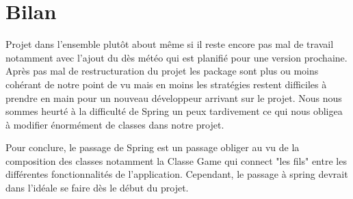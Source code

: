 \chapter{Bilan}

Projet dans l'ensemble plutôt about même si il  reste encore pas mal de travail notamment avec l'ajout du dès météo qui est planifié pour une version prochaine. Après pas mal de restructuration du projet les package sont plus ou moins cohérant de notre point de vu mais en moins les stratégies restent difficiles à prendre en main pour un nouveau développeur arrivant sur le projet. Nous nous sommes heurté à la difficulté de Spring un peux tardivement ce qui nous obligea à modifier énormément de classes dans notre projet.


Pour conclure, le passage de Spring est un passage obliger au vu de la composition des classes notamment la Classe Game qui connect "les fils" entre les différentes fonctionnalités de l'application. Cependant, le passage à spring devrait dans l'idéale se faire dès le début du projet.